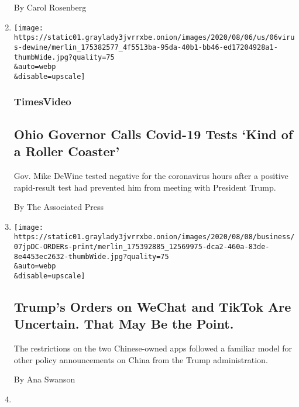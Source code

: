 \begin{enumerate}
  By Carol Rosenberg
\item
  \href{/video/us/politics/100000007279160/coronavirus-ohio-governor.html}{}

  \texttt{[image: https://static01.graylady3jvrrxbe.onion/images/2020/08/06/us/06virus-dewine/merlin\_175382577\_4f5513ba-95da-40b1-bb46-ed17204928a1-thumbWide.jpg?quality=75\\\&auto=webp\\\&disable=upscale]}

  \hypertarget{timesvideo}{%
  \subsubsection{TimesVideo}\label{timesvideo}}

  \hypertarget{ohio-governor-calls-covid-19-tests-kind-of-a-roller-coaster}{%
  \subsection{Ohio Governor Calls Covid-19 Tests `Kind of a Roller
  Coaster'}\label{ohio-governor-calls-covid-19-tests-kind-of-a-roller-coaster}}

  Gov. Mike DeWine tested negative for the coronavirus hours after a
  positive rapid-result test had prevented him from meeting with
  President Trump.

  By The Associated Press
\item
  \href{/2020/08/07/business/economy/trump-executive-order-tiktok-wechat.html}{}

  \texttt{[image: https://static01.graylady3jvrrxbe.onion/images/2020/08/08/business/07jpDC-ORDERs-print/merlin\_175392885\_12569975-dca2-460a-83de-8e4453ec2632-thumbWide.jpg?quality=75\\\&auto=webp\\\&disable=upscale]}

  \hypertarget{trumps-orders-on-wechat-and-tiktok-are-uncertain-that-may-be-the-point}{%
  \subsection{Trump's Orders on WeChat and TikTok Are Uncertain. That
  May Be the
  Point.}\label{trumps-orders-on-wechat-and-tiktok-are-uncertain-that-may-be-the-point}}

  The restrictions on the two Chinese-owned apps followed a familiar
  model for other policy announcements on China from the Trump
  administration.

  By Ana Swanson
\item
  \href{/2020/08/07/us/politics/russia-china-trump-biden-election-interference.html}{}


\end{enumerate}
